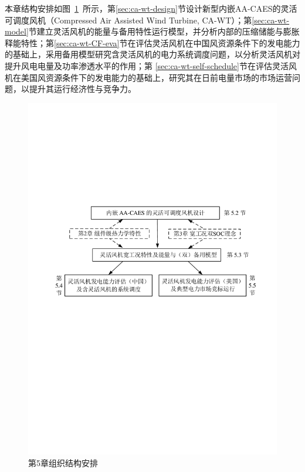 本章结构安排如图~\ref{fig:CAWT-Flow-Chart}~所示，第\ref{sec:ca-wt-design}节设计新型内嵌AA-CAES的灵活可调度风机（Compressed Air Assisted Wind Turbine, CA-WT）；第\ref{sec:ca-wt-model}节建立灵活风机的能量与备用特性运行模型，并分析内部的压缩储能与膨胀释能特性；第\ref{sec:ca-wt-CF-eva}节在评估灵活风机在中国风资源条件下的发电能力的基础上，采用备用模型研究含灵活风机的电力系统调度问题，以分析灵活风机对提升风电电量及功率渗透水平的作用；第
\ref{sec:ca-wt-self-schedule}节在评估灵活风机在美国风资源条件下的发电能力的基础上，研究其在日前电量市场的市场运营问题，以提升其运行经济性与竞争力。

\begin{figure}[H] %
  \centering
  \includegraphics[scale=0.78]{figures/Chap5-1-WT-Flow-Chart-V4.pdf}
  \caption{第5章组织结构安排}
  \label{fig:CAWT-Flow-Chart}
\end{figure}

